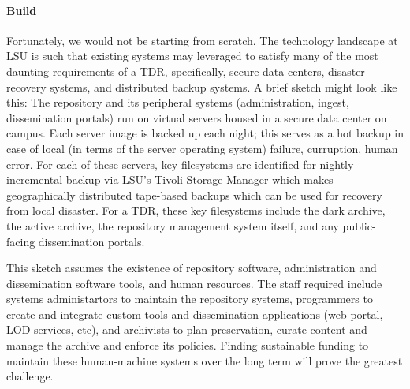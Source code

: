 \paragraph{Build}
Fortunately, we would not be starting from scratch. The technology landscape at LSU is such that existing systems may leveraged to satisfy many of the most daunting requirements of a TDR, specifically, secure data centers, disaster recovery systems, and distributed backup systems. A brief sketch might look like this: The repository and its peripheral systems (administration, ingest, dissemination portals) run on virtual servers housed in a secure data center on campus. Each server image is backed up each night; this serves as a hot backup in case of local (in terms of the server operating system) failure, curruption, human error. For each of these servers, key filesystems are identified for nightly incremental backup via LSU's Tivoli Storage Manager which makes geographically distributed tape-based backups which can be used for recovery from local disaster. For a TDR, these key filesystems include the dark archive, the active archive, the repository management system itself, and any public-facing dissemination portals.

This sketch assumes the existence of repository software, administration and dissemination software tools, and human resources. The staff required include systems administartors to maintain the repository systems, programmers to create and integrate custom tools and dissemination applications (web portal, LOD services, etc), and archivists to plan preservation, curate content and manage the archive and enforce its policies.  Finding sustainable funding to maintain these human-machine systems over the long term will prove the greatest challenge. 

